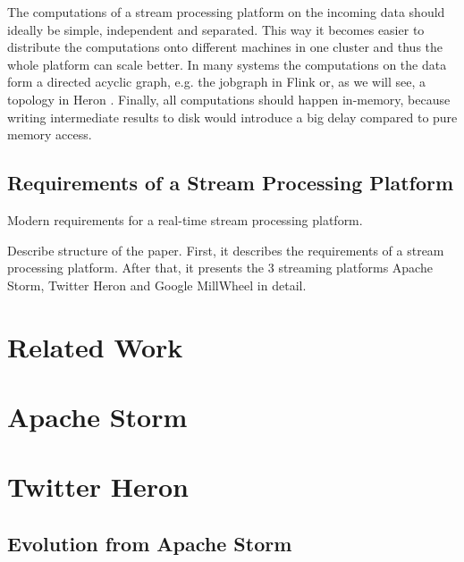 \documentclass[conference]{IEEEtran}
\begin{document}
The computations of a stream processing platform on the incoming data should ideally be simple, independent and separated.
This way it becomes easier to distribute the computations onto different machines in one cluster and thus the whole platform can scale better.
In many systems the computations on the data form a directed acyclic graph, e.g. the jobgraph in Flink or, as we will see, a topology in Heron \cite{Flink}.
Finally, all computations should happen in-memory, because writing intermediate results to disk would introduce a big delay compared to pure memory access.

\subsection{Requirements of a Stream Processing Platform}
\label{sec:RequirementsOfAStreamProcessingPlatform}

Modern requirements for a real-time stream processing platform.

\cite{The8Requirements}
\cite{ElasticScalingStreamProcessing}
\cite{OnlyOneLook}
\cite{YARN}
\cite{ScalableDistributedStreamProcessing}

Describe structure of the paper.
First, it describes the requirements of a stream processing platform.
After that, it presents the 3 streaming platforms Apache Storm, Twitter Heron and Google MillWheel in detail.

\section{Related Work}
\label{sec:RelatedWork}

\cite{InfoQGameChanger}

\section{Apache Storm}
\label{sec:ApacheStorm}

\cite{StormTwitter}

\section{Twitter Heron}
\label{sec:TwitterHeron}

\subsection{Evolution from Apache Storm}
\label{sec:EvolutionFromApacheStorm}
\end{document}
